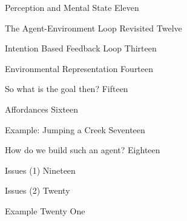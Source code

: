 \documentclass[xcolor=dvipsnames,t]{beamer}
\begin{document}
\begin{frame}{Perception and Mental State}
Eleven
\end{frame} 

\begin{frame}{The Agent-Environment Loop Revisited}
Twelve
\end{frame} 

\begin{frame}{Intention Based Feedback Loop}
Thirteen
\end{frame} 

\begin{frame}{Environmental Representation} 
Fourteen
\end{frame} 

\begin{frame}{So what is the goal then?}
Fifteen
\end{frame} 

\begin{frame}{Affordances}
Sixteen
\end{frame} 

\begin{frame}{Example: Jumping a Creek} 
Seventeen
\end{frame} 

\begin{frame}{How do we build such an agent?}
Eighteen
\end{frame} 

\begin{frame}{Issues (1)}
Nineteen
\end{frame} 

\begin{frame}{Issues (2)}
Twenty
\end{frame} 

\begin{frame}{Example} 
Twenty One
\end{frame} 
\end{document}

